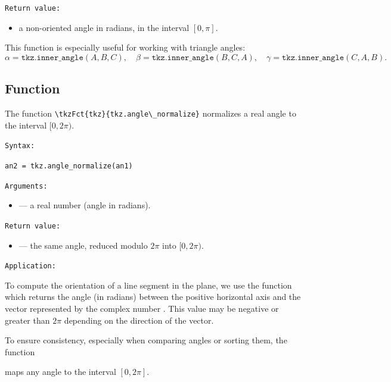 \texttt{Return value:}
\begin{itemize}
  \item a non-oriented angle in radians, in the interval $[0, \pi]$.
\end{itemize}

\medskip
This function is especially useful for working with triangle angles:
\[
\alpha = \texttt{tkz.inner\_angle}(A,B,C),\quad
\beta  = \texttt{tkz.inner\_angle}(B,C,A),\quad
\gamma = \texttt{tkz.inner\_angle}(C,A,B).
\]




\subsection{Function }
\label{sub:tkz_angle_normalize}

The function \verb|\tkzFct{tkz}{tkz.angle\_normalize}| normalizes a real angle to the interval
$[0, 2\pi)$.

\medskip
\texttt{Syntax: }

\verb|an2 = tkz.angle_normalize(an1)|


\texttt{Arguments: }
\begin{itemize}
  \item {} — a real number (angle in radians).
\end{itemize}

\texttt{Return value:}
\begin{itemize}
  \item {} — the same angle, reduced modulo $2\pi$ into $[0, 2\pi)$.
\end{itemize}

\medskip
\texttt{Application: }

To compute the orientation of a line segment in the plane, we use the function  which returns the angle (in radians) between the positive horizontal axis and the vector represented by the complex number . This value may be negative or greater than $2\pi$ depending on the direction of the vector.

\medskip
To ensure consistency, especially when comparing angles or sorting them, the function

 maps any angle to the interval $[0, 2\pi]$.


